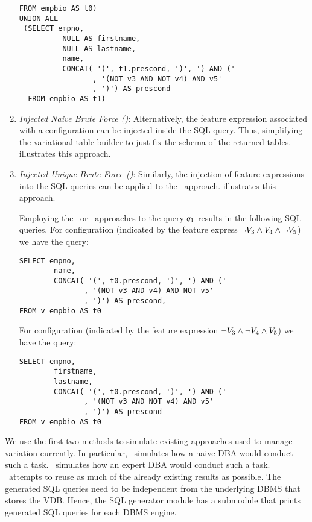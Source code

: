 \begin{enumerate}
\begin{example}
\begin{lstlisting}[basicstyle=\footnotesize\ttfamily,columns=flexible,lineskip=0.5\baselineskip]
  FROM empbio AS t0) 
UNION ALL 
 (SELECT empno,
          NULL AS firstname,
          NULL AS lastname,
          name,
          CONCAT( '(', t1.prescond, ')', ') AND ('
                 , '(NOT v3 AND NOT v4) AND v5'
                 , ')') AS prescond
  FROM empbio AS t1)
 \end{lstlisting}
%
\end{example}
%
\item 
\emph{Injected Naive Brute Force (\nbfi)}: 
Alternatively, the feature expression associated with a configuration can be injected
inside the SQL query. Thus, simplifying the variational table builder to just fix the 
schema of the returned tables.  illustrates this approach. 
%
\item 
\emph{Injected Unique Brute Force (\ubfi)}:
Similarly, the injection of feature expressions into the SQL queries can be applied to
the \ubf\ approach.  illustrates this approach.
%
\begin{example}
\label{eg:ubfi}
Employing the \nbfi\ or \ubfi\ approaches to the query $\vQ_1$ results in the following SQL queries.
For configuration \setDef {\vFour} (indicated by the feature
express $\neg \vThree \wedge \vFour \wedge \neg \vFive$) we have the query:
%
\begin{lstlisting}[basicstyle=\footnotesize\ttfamily,columns=flexible,lineskip=0.5\baselineskip]
SELECT empno, 
        name,
        CONCAT( '(', t0.prescond, ')', ') AND ('
               , '(NOT v3 AND v4) AND NOT v5'
               , ')') AS prescond,
FROM v_empbio AS t0
\end{lstlisting}
%
For configuration \setDef {\vFive} (indicated 
by the feature expression $\neg \vThree \wedge \neg \vFour \wedge \vFive$) we have the
query:
%
\begin{lstlisting}[basicstyle=\footnotesize\ttfamily,columns=flexible,lineskip=0.5\baselineskip]
SELECT empno,
        firstname, 
        lastname,
        CONCAT( '(', t0.prescond, ')', ') AND ('
               , '(NOT v3 AND NOT v4) AND v5'
               , ')') AS prescond
FROM v_empbio AS t0
 \end{lstlisting}
%
\end{example}
\end{enumerate}

We use the first two methods
to simulate existing approaches used to manage
variation currently. In particular, \nbf\ simulates how a naive
DBA would conduct such a task. \ubf\ simulates
how an expert DBA would conduct such a task. 
\uav\ attempts to reuse as much of the already existing results as possible. 
%
The generated SQL queries need to be independent from the 
underlying DBMS that stores the VDB. Hence, the SQL generator module
has a submodule that prints generated SQL queries for each DBMS engine. 


